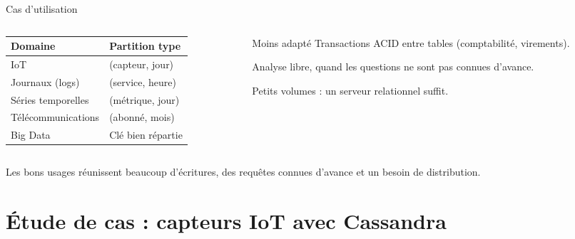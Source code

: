 \documentclass[aspectratio=169,10pt]{beamer}
\begin{document}
\begin{frame}{Cas d'utilisation}
  \begin{columns}[T]
    \begin{column}{0.53\textwidth}
      \small
      \begin{tabularx}{\linewidth}{@{}>{\raggedright\arraybackslash}p{2.6cm}>{\raggedright\arraybackslash}X@{}}
        \toprule
        Domaine & Partition type \\
        \midrule
        IoT & (capteur, jour) \\
        Journaux (logs) & (service, heure) \\
        Séries temporelles & (métrique, jour) \\
        Télécommunications & (abonné, mois) \\
        Big Data & Clé bien répartie \\
        \bottomrule
      \end{tabularx}
    \end{column}
    \begin{column}{0.4\textwidth}
      \begin{block}{Moins adapté}
        \small
        Transactions ACID entre tables (comptabilité, virements).\par\medskip
        Analyse libre, quand les questions ne sont pas connues d'avance.\par\medskip
        Petits volumes : un serveur relationnel suffit.
      \end{block}
    \end{column}
  \end{columns}
  \vspace{0.4cm}
  Les bons usages réunissent beaucoup d'écritures, des requêtes connues d'avance et un besoin de distribution.
\end{frame}

\section{Étude de cas : capteurs IoT avec Cassandra}
\end{document}
